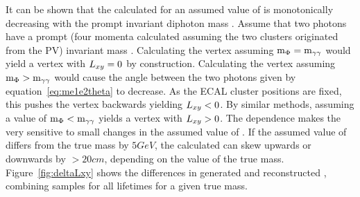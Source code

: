 It can be shown that the calculated \lxy for an assumed value of \mphi is monotonically decreasing with the prompt invariant diphoton mass \mgg. Assume that two photons have a prompt (four momenta calculated assuming the two clusters originated from the PV) invariant mass \mgg. Calculating the vertex assuming $\text{m}_\Phi=\text{m}_{\gamma\gamma}$ would yield a vertex with $L_{xy}=0$ by construction. Calculating the vertex assuming $\text{m}_\Phi>\text{m}_{\gamma\gamma}$ would cause the angle between the two photons given by equation~\ref{eq:me1e2theta} to decrease. As the ECAL cluster positions are fixed, this pushes the vertex backwards yielding $L_{xy}<0$. By similar methods, assuming a value of $\text{m}_\Phi<\text{m}_{\gamma\gamma}$ yields a vertex with $L_{xy}>0$. The dependence makes the \lxy very sensitive to small changes in the assumed value of \mphi. If the assumed value of \mphi differs from the true mass by $5\unit{GeV}$, the calculated \lxy can skew upwards or downwards by $>20\unit{cm}$, depending on the value of the true mass. Figure~\ref{fig:deltaLxy} shows the differences in generated and reconstructed \lxy, combining samples for all lifetimes for a given true mass.

